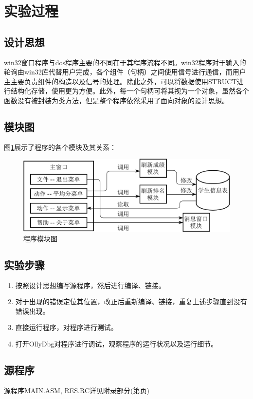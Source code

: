\documentclass{article}
\begin{document}
	\section{实验过程}
	\subsection{设计思想}
	win32窗口程序与dos程序主要的不同在于其程序流程不同。win32程序对于输入的轮询由win32库代替用户完成，各个组件（句柄）之间使用信号进行通信，而用户主主要负责组件的构造以及信号的处理。除此之外，可以将数据使用STRUCT进行结构化存储，使用更为方便。此外，每一个句柄可将其视为一个对象，虽然各个函数没有被封装为类方法，但是整个程序依然采用了面向对象的设计思想。

	\subsection{模块图}
	图\ref{fig:modules}展示了程序的各个模块及其关系：\par
	\begin{figure}[H]
		\centering
		\includegraphics[width=0.85\linewidth]{res/homework_5/modules.png}
		\caption{程序模块图}
		\label{fig:modules}
	\end{figure}

	\subsection{实验步骤}
	\begin{enumerate}
		\item 按照设计思想编写源程序，然后进行编译、链接。
		\item 对于出现的错误定位其位置，改正后重新编译、链接，重复上述步骤直到没有错误出现。
		\item 直接运行程序，对程序进行测试。
		\item 打开OllyDbg对程序进行调试，观察程序的运行状况以及运行细节。
	\end{enumerate}

	\subsection{源程序}
	源程序MAIN.ASM, RES.RC详见附录部分(第\pageref{code:5_1}页)
\end{document}
